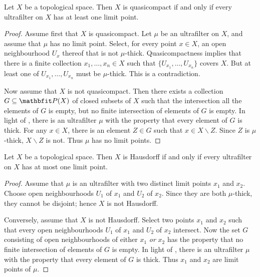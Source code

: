 \begin{lem} \label{quasicompactiffeveryultrafilterhasalimitpoint}
	Let $ X $ be a topological space.
	Then $ X $ is quasicompact if and only if every ultrafilter on $ X $ has at least one limit point.
\end{lem}

\begin{proof}
	Assume first that $ X $ is quasicompact.
	Let $ \mu $ be an ultrafilter on $ X $, and assume that $ \mu $ has no limit point.
	Select, for every point $ x \in X $, an open neighbourhood $ U_x $ thereof that is not $ \mu $-thick.
	Quasicompactness implies that there is a finite collection $ x_1, \dots, x_n \in X $ such that $ \{ U_{x_1}, \dots, U_{x_n} \} $ covers $ X $.
	But at least one of $ U_{x_1}, \dots, U_{x_n} $ must be $ \mu $-thick.
	This is a contradiction.

	Now assume that $ X $ is not quasicompact.
	Then there exists a collection $ G \subseteq \PP(X) $ of closed subsets of $ X $ such that the intersection all the elements of $ G $ is empty, but no finite intersection of elements of $ G $ is empty.
	In light of , there is an ultrafilter $ \mu $ with the property that every element of $ G $ is thick.
	For any $ x \in X $, there is an element $ Z \in G $ such that $ x \in X \smallsetminus Z $.
	Since $ Z $ is $ \mu $-thick, $ X \smallsetminus Z $ is not.
	Thus $ \mu $ has no limit points.
\end{proof}

\begin{lem} \label{hausdorffiffeveryultrafilterhasatmostonelimitpoint}
	Let $ X $ be a topological space.
	Then $ X $ is Hausdorff if and only if every ultrafilter on $ X $ has at most one limit point.
\end{lem}

\begin{proof}
	Assume that $ \mu $ is an ultrafilter with two distinct limit points $ x_1 $ and $ x_2 $.
	Choose open neighbourhoods $ U_1 $ of $ x_1 $ and $ U_2 $ of $ x_2 $.
	Since they are both $ \mu $-thick, they cannot be disjoint;
	hence $ X $ is not Hausdorff.

	Conversely, assume that $ X $ is not Hausdorff.
	Select two points $ x_1 $ and $ x_2 $ such that every open neighbourhoods $ U_1 $ of $ x_1 $ and $ U_2 $ of $ x_2 $ intersect.
	Now the set $ G $ consisting of open neighbourhoods of either $ x_1 $ \emph{or} $ x_2 $ has the property that no finite intersection of elements of $ G $ is empty.
	In light of , there is an ultrafilter $ \mu $ with the property that every element of $ G $ is thick.
	Thus $ x_1 $ and $ x_2 $ are limit points of $ \mu $.
\end{proof}

